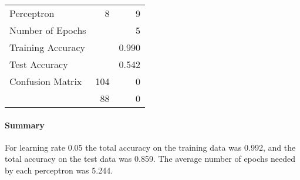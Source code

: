 \documentclass[11pt]{article}
\begin{document}
\begin{minipage}[t]{0.5\textwidth}
\begin{tabular}{|l | r r|}
\hline Perceptron & 8 & 9\\
Number of Epochs & & 5\\
Training Accuracy & & 0.990\\
Test Accuracy & & 0.542\\
Confusion Matrix & 104 & 0\\
 &88 & 0\\ \hline
\end{tabular}
\end{minipage}
\paragraph{Summary} For learning rate 0.05 the total accuracy on the training data was 0.992, and the total accuracy on the test data was 0.859.  The average number of epochs needed by each perceptron was 5.244.
\end{document}
